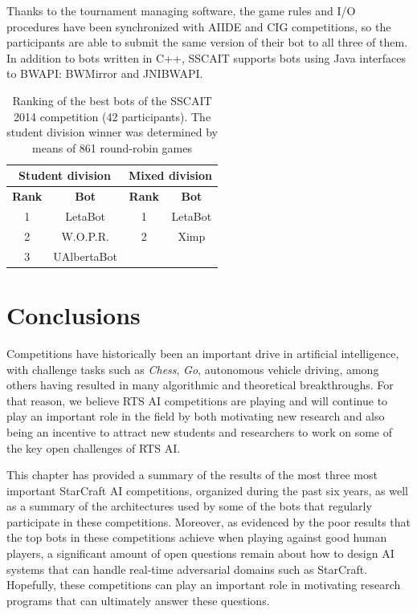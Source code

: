\documentclass{llncs}
\begin{document}
Thanks to the tournament managing software, the game rules and I/O procedures have been synchronized with AIIDE and CIG competitions, so the participants are able to submit the same version of their bot to all three of them. In addition to bots written in C++, SSCAIT supports bots using Java interfaces to BWAPI: BWMirror and JNIBWAPI. 

\begin{table}[!t]
\caption{Ranking of the best bots of the SSCAIT 2014 competition (42 participants).
The student division winner was determined by means of 861 round-robin games}
\label{tab:sscait2014}
\centering
\begin{tabular}{|c|c|c|c|}
\hline
\multicolumn{2}{|c|}{Student division} & \multicolumn{2}{|c|}{Mixed division}\\ \hline
{\bfseries Rank} & {\bfseries Bot} & {\bfseries Rank} & {\bfseries Bot} \\
\hline
1 & LetaBot & 1 & LetaBot \\
2 & W.O.P.R.  & 2 & Ximp \\
3 & UAlbertaBot 			&   &  \\
\hline
\end{tabular}
\end{table}


\section*{Conclusions}

Competitions have historically been an important drive in artificial intelligence, with challenge tasks such as {\em Chess}, {\em Go}, autonomous vehicle driving, among others having resulted in many algorithmic and theoretical breakthroughs. For that reason, we believe RTS AI competitions are playing and will continue to play an important role in the field by both motivating new research and also being an incentive to attract new students and researchers to work on some of the key open challenges of RTS AI.

This chapter has provided a summary of the results of the most three most important StarCraft AI competitions, organized during the past six years, as well as a summary of the architectures used by some of the bots that regularly participate in these competitions. Moreover, as evidenced by the poor results that the top bots in these competitions achieve when playing against good human players, a significant amount of open questions remain about how to design AI systems that can handle real-time adversarial domains such as StarCraft. Hopefully, these competitions can play an important role in motivating research programs that can ultimately answer these questions.
\end{document}
